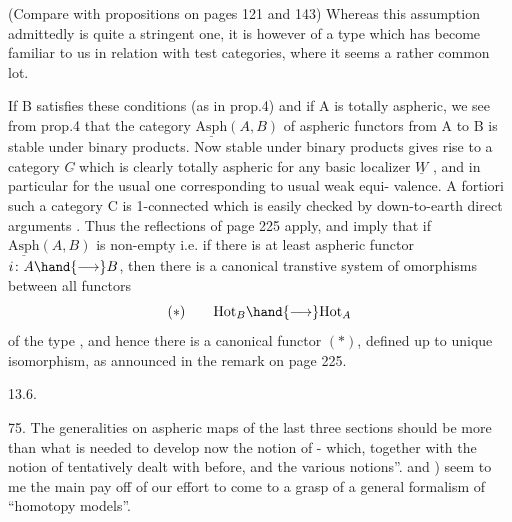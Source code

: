 
(Compare with propositions on pages 121 and 143) Whereas this  assumption
admittedly is quite a stringent one, it is however of a type which has
become familiar to us in relation with test categories, where it seems a
rather common lot.

If B satisfies these conditions (as in prop.4) and if A is totally
aspheric, we see from prop.4 that the category $\underline{\mathrm{Asph}}(A,B)$ of aspheric
functors from A to B is stable under binary products. Now 
 stable under binary products gives rise to a
category $C\hat{}$ which is clearly totally aspheric for any basic localizer $\underline{W}$ ,
and in particular for the usual one  corresponding to usual weak equi-%
valence. A fortiori such a category C  is 1-connected \hand{$\leftarrow$} \hand{(}which is easily
checked  by down-to-earth direct arguments\hand{)} . Thus the reflections of
page 225 apply, and imply that if $\underline{\mathrm{Asph}}(A,B)$ is non-empty i.e. if there
is at least \hand{\uline{\textcolor{black}{one}}} aspheric functor $i\colon A\hand{\longrightarrow} B$, then there is a canonical
transtive system of omorphisms between all functors
\[ (\ast) \qquad \mathrm{Hot}_B \hand{\longrightarrow} \mathrm{Hot}_A \]
 of the type , and hence there is a canonical functor $(\ast)$, defined up
to unique isomorphism, as announced in the remark on page 225.

13.6.

75. The generalities on aspheric maps of the last three sections should
be more than what is needed to develop now the notion of \hand{\uline{\textcolor{black}{asphericity
structure}}} - which, \unsure{\hand{,}}together with the  notion of \hand{\uline{\textcolor{black}{contractibility struc-%
ture}}}\hand{,} tentatively dealt with before, and the various notions''\hand{(}. \hand{\uline{\textcolor{black}{test}}}
 \hand{\uline{\textcolor{black}{categories}}} and ) seem to me  the main
pay off   of our effort to come to a grasp of a general formalism
of ``homotopy models''.

